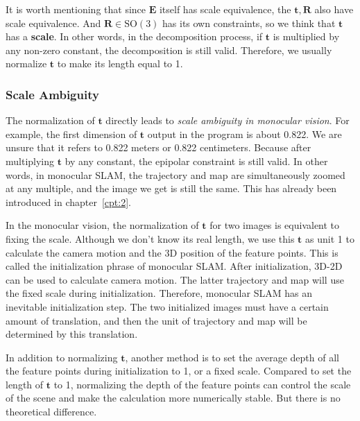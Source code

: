It is worth mentioning that since $\mathbf{E}$ itself has scale equivalence, the $\mathbf{t}, \mathbf{R}$ also have scale equivalence. And $\mathbf{R} \in \mathrm{SO}(3)$ has its own constraints, so we think that $\mathbf{t}$ has a \textbf{scale}. In other words, in the decomposition process, if $\mathbf{t}$ is multiplied by any non-zero constant, the decomposition is still valid. Therefore, we usually normalize $\mathbf{t}$ to make its length equal to 1.

\subsubsection{Scale Ambiguity}
The normalization of $\mathbf{t}$ directly leads to \textit{scale ambiguity in monocular vision}. For example, the first dimension of $\mathbf{t}$ output in the program is about 0.822. We are unsure that it refers to 0.822 meters or 0.822 centimeters. Because after multiplying $\mathbf{t}$ by any constant, the epipolar constraint is still valid. In other words, in monocular SLAM, the trajectory and map are simultaneously zoomed at any multiple, and the image we get is still the same. This has already been introduced in chapter~\ref{cpt:2}.

In the monocular vision, the normalization of $\mathbf{t}$ for two images is equivalent to fixing the scale. Although we don't know its real length, we use this $\mathbf{t}$ as unit 1 to calculate the camera motion and the 3D position of the feature points. This is called the initialization phrase of monocular SLAM. After initialization, 3D-2D can be used to calculate camera motion. The latter trajectory and map will use the fixed scale during initialization. Therefore, monocular SLAM has an inevitable initialization step. The two initialized images must have a certain amount of translation, and then the unit of trajectory and map will be determined by this translation.

In addition to normalizing $\mathbf{t}$, another method is to set the average depth of all the feature points during initialization to 1, or a fixed scale. Compared to set the length of $\mathbf{t}$ to 1, normalizing the depth of the feature points can control the scale of the scene and make the calculation more numerically stable. But there is no theoretical difference.

